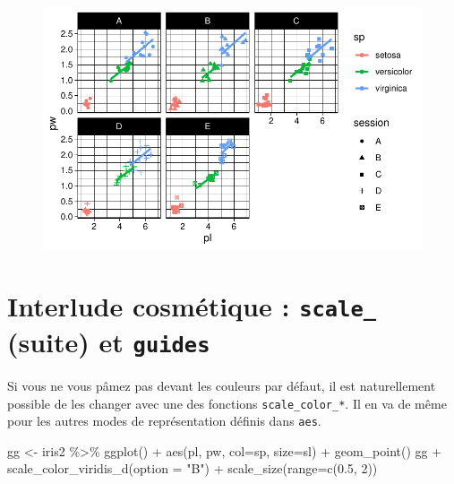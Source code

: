 \documentclass[
  letterpaper,
  DIV=11,
  numbers=noendperiod]{scrreprt}
\newenvironment{Shaded}{\begin{snugshade}}{\end{snugshade}}
\newcommand{\AttributeTok}[1]{\textcolor[rgb]{0.40,0.45,0.13}{#1}}
\newcommand{\DecValTok}[1]{\textcolor[rgb]{0.68,0.00,0.00}{#1}}
\newcommand{\FloatTok}[1]{\textcolor[rgb]{0.68,0.00,0.00}{#1}}
\newcommand{\FunctionTok}[1]{\textcolor[rgb]{0.28,0.35,0.67}{#1}}
\newcommand{\NormalTok}[1]{\textcolor[rgb]{0.00,0.23,0.31}{#1}}
\newcommand{\OtherTok}[1]{\textcolor[rgb]{0.00,0.23,0.31}{#1}}
\newcommand{\SpecialCharTok}[1]{\textcolor[rgb]{0.37,0.37,0.37}{#1}}
\newcommand{\StringTok}[1]{\textcolor[rgb]{0.13,0.47,0.30}{#1}}
\begin{document}
\begin{figure}[H]

{\centering \includegraphics{ggplot2_files/figure-pdf/unnamed-chunk-28-1.pdf}

}

\end{figure}

\hypertarget{interlude-cosmuxe9tique-scale_-suite-et-guides}{%
\section{\texorpdfstring{Interlude cosmétique : \texttt{scale\_} (suite)
et
\texttt{guides}}{Interlude cosmétique : scale\_ (suite) et guides}}\label{interlude-cosmuxe9tique-scale_-suite-et-guides}}

Si vous ne vous pâmez pas devant les couleurs par défaut, il est
naturellement possible de les changer avec une des fonctions
\texttt{scale\_color\_*}. Il en va de même pour les autres modes de
représentation définis dans \texttt{aes}.

\begin{Shaded}
\begin{Highlighting}[]
\NormalTok{gg }\OtherTok{\textless{}{-}}\NormalTok{ iris2 }\SpecialCharTok{\%\textgreater{}\%} \FunctionTok{ggplot}\NormalTok{() }\SpecialCharTok{+} \FunctionTok{aes}\NormalTok{(pl, pw, }\AttributeTok{col=}\NormalTok{sp, }\AttributeTok{size=}\NormalTok{sl) }\SpecialCharTok{+} \FunctionTok{geom\_point}\NormalTok{()}
\NormalTok{gg }\SpecialCharTok{+} \FunctionTok{scale\_color\_viridis\_d}\NormalTok{(}\AttributeTok{option =} \StringTok{"B"}\NormalTok{) }\SpecialCharTok{+} \FunctionTok{scale\_size}\NormalTok{(}\AttributeTok{range=}\FunctionTok{c}\NormalTok{(}\FloatTok{0.5}\NormalTok{, }\DecValTok{2}\NormalTok{))}
\end{Highlighting}
\end{Shaded}
\end{document}
